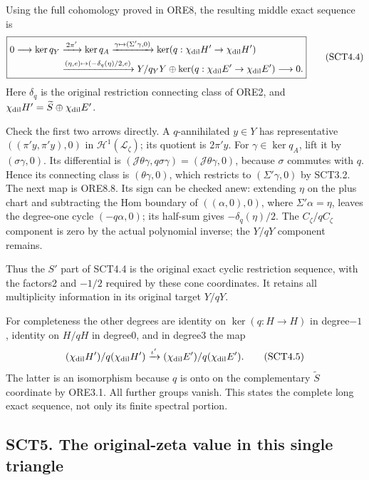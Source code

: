 Using the full cohomology proved in ORE8, the resulting middle exact
sequence is \[
\boxed{
\begin{aligned}
0\longrightarrow\ker q_Y
&\xrightarrow{\,2\pi'\,}\ker q_A
\xrightarrow{\gamma\mapsto(\Sigma'\gamma,0)}
\ker(q:\chi_{\rm dil}H'\to\chi_{\rm dil}H')\\
&\xrightarrow{(\eta,e)\mapsto(-\delta_q(\eta)/2,e)}
Y/q_Y Y\oplus\ker(q:\chi_{\rm dil}E'\to\chi_{\rm dil}E')
\longrightarrow0 .
\end{aligned}}
\tag{SCT4.4}
\] Here \(\delta_q\) is the original restriction connecting class of
ORE2, and \(\chi_{\rm dil}H'=\widetilde S\oplus\chi_{\rm dil}E'\).

Check the first two arrows directly. A \(q\)-annihilated \(y\in Y\) has
representative \(((\pi'y,\pi'y),0)\) in
\(\mathscr H^1(\mathcal L_\zeta)\); its quotient is \(2\pi'y\). For
\(\gamma\in\ker q_A\), lift it by \((\sigma\gamma,0)\). Its differential
is
\((\mathcal J\theta\gamma,q\sigma\gamma)=(\mathcal J\theta\gamma,0)\),
because \(\sigma\) commutes with \(q\). Hence its connecting class is
\((\theta\gamma,0)\), which restricts to \((\Sigma'\gamma,0)\) by
SCT3.2. The next map is ORE8.8. Its sign can be checked anew: extending
\(\eta\) on the plus chart and subtracting the Hom boundary of
\(((\alpha,0),0)\), where \(\Sigma'\alpha=\eta\), leaves the degree-one
cycle \((-q\alpha,0)\); its half-sum gives \(-\delta_q(\eta)/2\). The
\(C_\zeta/qC_\zeta\) component is zero by the actual polynomial inverse;
the \(Y/qY\) component remains.

Thus the \(S'\) part of SCT4.4 is the original exact cyclic restriction
sequence, with the factors2 and \(-1/2\) required by these cone
coordinates. It retains all multiplicity information in its original
target \(Y/qY\).

For completeness the other degrees are identity on \(\ker(q:H\to H)\) in
degree\(-1\), identity on \(H/qH\) in degree0, and in degree3 the map \[
(\chi_{\rm dil}H')/q(\chi_{\rm dil}H')
\xrightarrow{\iota'}
(\chi_{\rm dil}E')/q(\chi_{\rm dil}E').
\tag{SCT4.5}
\] The latter is an isomorphism because \(q\) is onto on the
complementary \(\widetilde S\) coordinate by ORE3.1. All further groups
vanish. This states the complete long exact sequence, not only its
finite spectral portion.

\subsection{SCT5. The original-zeta value in this single
triangle}\label{sct5.-the-original-zeta-value-in-this-single-triangle}

